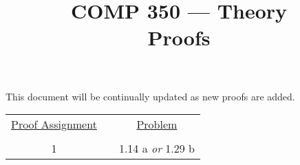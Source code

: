 \documentclass[nobib]{tufte-handout}
\title{COMP 350 --- Theory \\ Proofs}
\begin{document}
\maketitle

This document will be continually updated as new proofs are added.

\begin{center}
\begin{tabular}{ccc}
  \underline{Proof Assignment} & \hspace{.5in} &  \underline{Problem} \\ \\
  1 & & 1.14 a \textit{or} 1.29 b
\end{tabular}
\end{center}
\end{document}
